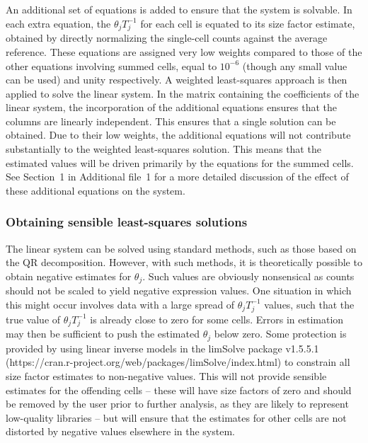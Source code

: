 \documentclass{bmcart}
\newcommand{\supplineardep}{1}
\begin{document}
An additional set of equations is added to ensure that the system is solvable.
In each extra equation, the $\theta_jT_j^{-1}$ for each cell is equated to its size factor estimate, obtained by directly normalizing the single-cell counts against the average reference.
These equations are assigned very low weights compared to those of the other equations involving summed cells, equal to $10^{-6}$ (though any small value can be used) and unity respectively.
A weighted least-squares approach is then applied to solve the linear system.
In the matrix containing the coefficients of the linear system, the incorporation of the additional equations ensures that the columns are linearly independent.
This ensures that a single solution can be obtained.
Due to their low weights, the additional equations will not contribute substantially to the weighted least-squares solution.
This means that the estimated values will be driven primarily by the equations for the summed cells.
See Section~\supplineardep{} in Additional file~1 for a more detailed discussion of the effect of these additional equations on the system.


\subsubsection*{Obtaining sensible least-squares solutions}
The linear system can be solved using standard methods, such as those based on the QR decomposition.
However, with such methods, it is theoretically possible to obtain negative estimates for $\theta_j$.
Such values are obviously nonsensical as counts should not be scaled to yield negative expression values.
One situation in which this might occur involves data with a large spread of $\theta_jT_j^{-1}$ values, 
    such that the true value of $\theta_jT_j^{-1}$ is already close to zero for some cells.
Errors in estimation may then be sufficient to push the estimated $\theta_j$ below zero.
Some protection is provided by using linear inverse models in the limSolve package v1.5.5.1 ({https://cran.r-project.org/web/packages/limSolve/index.html}) \cite{soetaert2009limsolve} to constrain all size factor estimates to non-negative values.
This will not provide sensible estimates for the offending cells 
    -- these will have size factors of zero and should be removed by the user prior to further analysis, as they are likely to represent low-quality libraries 
    -- but will ensure that the estimates for other cells are not distorted by negative values elsewhere in the system.
\end{document}
